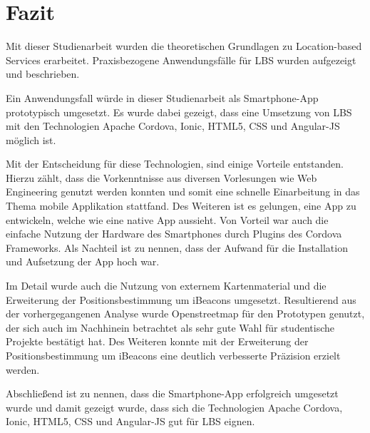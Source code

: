 \newpage
\section{Fazit}


Mit dieser Studienarbeit wurden die theoretischen Grundlagen zu Location-based Services erarbeitet. 
Praxisbezogene Anwendungsfälle für LBS wurden aufgezeigt und beschrieben.

Ein Anwendungsfall würde in dieser Studienarbeit als Smartphone-App prototypisch umgesetzt. 
Es wurde dabei gezeigt, dass eine Umsetzung von LBS mit den Technologien Apache Cordova, Ionic, HTML5, CSS und Angular-JS möglich ist. 

Mit der Entscheidung für diese Technologien, sind einige Vorteile entstanden. Hierzu zählt, dass die Vorkenntnisse aus diversen Vorlesungen wie Web Engineering genutzt werden konnten und somit eine schnelle Einarbeitung in das Thema mobile Applikation stattfand. Des Weiteren ist es gelungen, eine App zu entwickeln, welche wie eine native App aussieht. Von Vorteil war auch die einfache Nutzung der Hardware des Smartphones durch Plugins des Cordova Frameworks. Als Nachteil ist zu nennen, dass der Aufwand für die Installation und Aufsetzung der App hoch war.

Im Detail wurde auch die Nutzung von externem Kartenmaterial und die Erweiterung der Positionsbestimmung um iBeacons umgesetzt.
Resultierend aus der vorhergegangenen Analyse wurde Openstreetmap für den Prototypen genutzt, der sich auch im Nachhinein betrachtet als sehr gute Wahl für studentische Projekte bestätigt hat. Des Weiteren konnte mit der Erweiterung der Positionsbestimmung um iBeacons eine deutlich verbesserte Präzision erzielt werden. 

Abschließend ist zu nennen, dass die Smartphone-App erfolgreich umgesetzt wurde und damit gezeigt wurde, dass sich die Technologien Apache Cordova, Ionic, HTML5, CSS und Angular-JS gut für LBS eignen.


